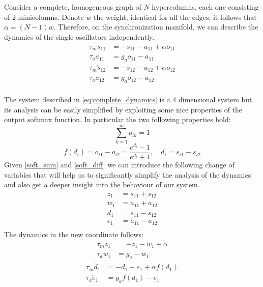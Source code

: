 Consider a complete, homogeneous graph of $N$ hypercolumns, each one consisting of 2 minicolumns. Denote $w$ the weight, identical for all the edges, it follows that $\alpha=(N-1)w$. Therefore, on the synchronization manifold, we can describe the dynamics of the single oscillators independently.
\begin{equation}
\begin{aligned}
    \tau_m \dot{s}_{11}&=-s_{11}-a_{11}+ \alpha o_{11} \\
    \tau_a \dot{a}_{11}&=g_a o_{11} - a_{11} \\
    \tau_m \dot{s}_{12}&=-s_{12}-a_{12}+ \alpha o_{12} \\
    \tau_a \dot{a}_{12}&=g_a o_{12} - a_{12} \\
\end{aligned}
\label{eq:complete_dynamics}
\end{equation}

The system described in \eqref{eq:complete_dynamics} is a 4 dimensional system but its analysis can be easily simplified by exploiting some nice properties of the output softmax function. In particular the two following properties hold:  
\begin{equation}
 \sum_{k=1}^{m} o_{i k}=1
 \label{soft_sum}
\end{equation}
\begin{equation}
 f(d_i)= o_{i1}-o_{i2}=\frac{e^{d_i}-1}{e^{d_i}+1}, \quad d_i = s_{i1}-s_{i2}
 \label{soft_diff}
\end{equation}
Given \eqref{soft_sum} and \eqref{soft_diff} we can introduce the following change of variables that will help us to significantly simplify the analysis of the dynamics and also get a deeper insight into the behaviour of our system. 
\begin{equation}
\begin{aligned}
z_1 &= s_{11} + s_{12} \\
w_1 &= a_{11} + a_{12} \\
d_1 &= s_{11} - s_{12} \\
e_1 &= a_{11} - a_{12} \\
\end{aligned}
\end{equation}
The dynamics in the new coordinate follows:
\begin{equation} 
\begin{aligned}
\tau_m \dot z_1 &= - z_1 - w_1 + \alpha\\
\tau_a \dot w_1 &= g_a - w_1
\end{aligned}
\label{eq:sum_dynamics}
\end{equation}
\begin{equation} 
\begin{aligned}
\tau_m \dot d_{1} &= - d_1 - e_1 + \alpha f(d_1) \\
\tau_a \dot{e}_{1} &= g_a f(d_1) - e_{1} \\
\end{aligned}
\label{eq:diff_dynamics}
\end{equation}

